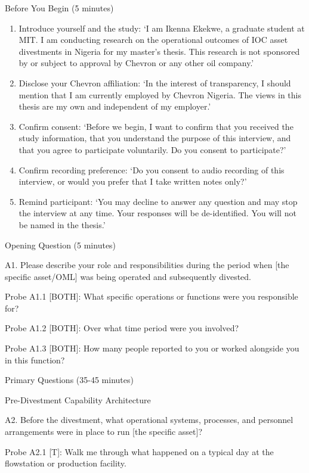 \documentclass[twoside,fontset=lmodern]{mitthesis}
\begin{document}
Before You Begin (5 minutes)

\begin{enumerate}
\def\labelenumi{\arabic{enumi}.}
\item
  Introduce yourself and the study: `I am Ikenna Ekekwe, a graduate
  student at MIT. I am conducting research on the operational outcomes
  of IOC asset divestments in Nigeria for my master's thesis. This
  research is not sponsored by or subject to approval by Chevron or any
  other oil company.'
\item
  Disclose your Chevron affiliation: `In the interest of transparency, I
  should mention that I am currently employed by Chevron Nigeria. The
  views in this thesis are my own and independent of my employer.'
\item
  Confirm consent: `Before we begin, I want to confirm that you received
  the study information, that you understand the purpose of this
  interview, and that you agree to participate voluntarily. Do you
  consent to participate?'
\item
  Confirm recording preference: `Do you consent to audio recording of
  this interview, or would you prefer that I take written notes only?'
\item
  Remind participant: `You may decline to answer any question and may
  stop the interview at any time. Your responses will be de-identified.
  You will not be named in the thesis.'
\end{enumerate}

Opening Question (5 minutes)

A1. Please describe your role and responsibilities during the period
when {[}the specific asset/OML{]} was being operated and subsequently
divested.

Probe A1.1 {[}BOTH{]}: What specific operations or functions were you
responsible for?

Probe A1.2 {[}BOTH{]}: Over what time period were you involved?

Probe A1.3 {[}BOTH{]}: How many people reported to you or worked
alongside you in this function?

Primary Questions (35-45 minutes)

Pre-Divestment Capability Architecture

A2. Before the divestment, what operational systems, processes, and
personnel arrangements were in place to run {[}the specific asset{]}?

Probe A2.1 {[}T{]}: Walk me through what happened on a typical day at
the flowstation or production facility.
\end{document}
